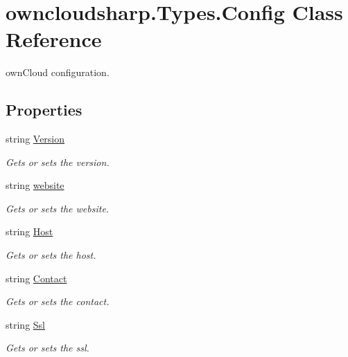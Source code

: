 \hypertarget{classowncloudsharp_1_1_types_1_1_config}{}\section{owncloudsharp.\+Types.\+Config Class Reference}
\label{classowncloudsharp_1_1_types_1_1_config}


own\+Cloud configuration.  


\subsection*{Properties}
\begin{DoxyCompactItemize}
\item 
string \hyperlink{classowncloudsharp_1_1_types_1_1_config_af3fae6f952897261eeb927f2e0cae79f}{Version}
\begin{DoxyCompactList}\small\item\em Gets or sets the version. \end{DoxyCompactList}\item 
string \hyperlink{classowncloudsharp_1_1_types_1_1_config_affdfbcb88e5cead0f1f4e693a2fc61b3}{website}
\begin{DoxyCompactList}\small\item\em Gets or sets the website. \end{DoxyCompactList}\item 
string \hyperlink{classowncloudsharp_1_1_types_1_1_config_a36887dfa541a00bd4b8f7def693150b5}{Host}
\begin{DoxyCompactList}\small\item\em Gets or sets the host. \end{DoxyCompactList}\item 
string \hyperlink{classowncloudsharp_1_1_types_1_1_config_ab4a9bf7102dfe2e637eb895f8d0a03e1}{Contact}
\begin{DoxyCompactList}\small\item\em Gets or sets the contact. \end{DoxyCompactList}\item 
string \hyperlink{classowncloudsharp_1_1_types_1_1_config_abf92cd17e728b4c5d028fe27bf36d255}{Ssl}
\begin{DoxyCompactList}\small\item\em Gets or sets the ssl. \end{DoxyCompactList}\end{DoxyCompactItemize}



